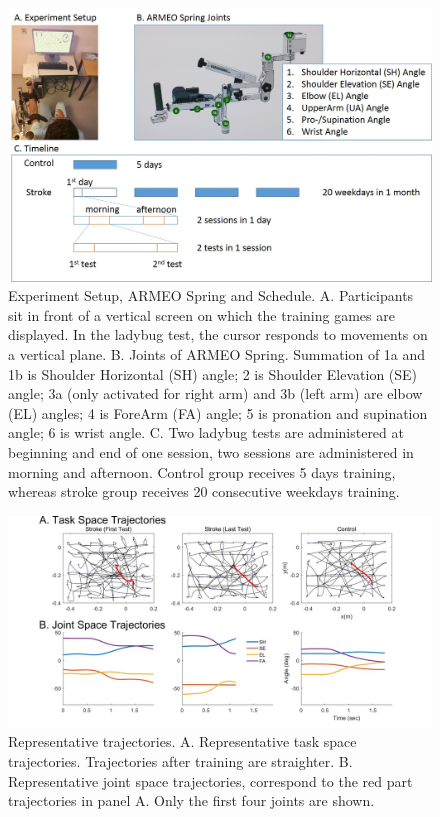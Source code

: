 \begin{figure}
	\centering
	\includegraphics[width=1\linewidth]{figures/1setup&schedule}
	\caption[Experiment Setup and Schedule]
	{Experiment Setup, ARMEO Spring and Schedule. 
		A. Participants sit in front of a vertical screen on which the training games are displayed. In the ladybug test, the cursor responds to movements on a vertical plane. 
		B. Joints of ARMEO Spring. Summation of 1a and 1b is Shoulder Horizontal (SH) angle; 2 is Shoulder Elevation (SE) angle; 3a (only activated for right arm) and 3b (left arm) are elbow (EL) angles; 4 is ForeArm (FA) angle; 5 is pronation and supination angle; 6 is wrist angle.
		C. Two ladybug tests are administered at beginning and end of one session, two sessions are administered in morning and afternoon. Control group receives 5 days training, whereas stroke group receives 20 consecutive weekdays training.}
	\label{fig:1setupschedule}
\end{figure}

\begin{figure}
	\centering
	\includegraphics[width=1\linewidth]{figures/2strokeTrajExamp}
	\caption[Example trajectories]
	{Representative trajectories. 
		A. Representative task space trajectories. Trajectories after training are straighter.
		B. Representative joint space trajectories, correspond to the red part trajectories in panel A. Only the first four joints are shown.}
	\label{fig:2stroketrajexamp}
\end{figure}

